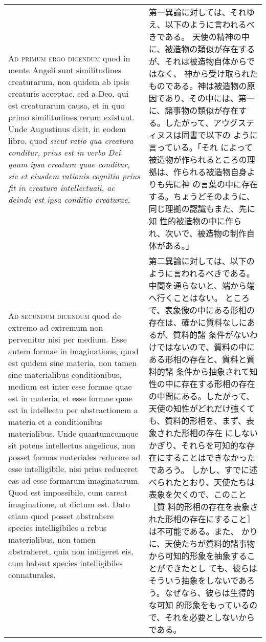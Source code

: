 \documentclass[10pt]{jsarticle} %
\begin{document}
\begin{longtable}{p{21em}p{21em}}
\\


{\scshape Ad primum ergo dicendum} quod in mente Angeli sunt
similitudines creaturarum, non quidem ab ipsis creaturis acceptae, sed a
Deo, qui est creaturarum causa, et in quo primo similitudines rerum
existunt. Unde Augustinus dicit, in eodem libro, quod {\itshape sicut ratio qua
creatura conditur, prius est in verbo Dei quam ipsa creatura quae
conditur, sic et eiusdem rationis cognitio prius fit in creatura
intellectuali, ac deinde est ipsa conditio creaturae}.

&

第一異論に対しては、それゆえ、以下のように言われるべきである。
天使の精神の中に、被造物の類似が存在するが、それは被造物自体からではなく、
 神から受け取られたものである。神は被造物の原因であり、その中には、第一
 に、諸事物の類似が存在する。したがって、アウグスティヌスは同書で以下の
 ように言っている。「それ
 によって被造物が作られるところの理拠は、作られる被造物自身よりも先に神
 の言葉の中に存在する。ちょうどそのように、同じ理拠の認識もまた、先に知
 性的被造物の中に作られ、次いで、被造物の制作自体がある。」

\\


{\scshape Ad secundum dicendum} quod de extremo ad extremum non
pervenitur nisi per medium. Esse autem formae in imaginatione, quod est
quidem sine materia, non tamen sine materialibus conditionibus, medium
est inter esse formae quae est in materia, et esse formae quae est in
intellectu per abstractionem a materia et a conditionibus
materialibus. Unde quantumcumque sit potens intellectus angelicus, non
posset formas materiales reducere ad esse intelligibile, nisi prius
reduceret eas ad esse formarum imaginatarum. Quod est impossibile, cum
careat imaginatione, ut dictum est. Dato etiam quod posset abstrahere
species intelligibiles a rebus materialibus, non tamen abstraheret, quia
non indigeret eis, cum habeat species intelligibiles connaturales.

&

第二異論に対しては、以下のように言われるべきである。
中間を通らないと、端から端へ行くことはない。
ところで、表象像の中にある形相の存在は、確かに質料なしにあるが、質料的諸
 条件がないわけではないので、質料の中にある形相の存在と、質料と質料的諸
 条件から抽象されて知性の中に存在する形相の存在の中間にある。したがって、
 天使の知性がどれだけ強くても、質料的形相を、まず、表象された形相の存在
 にしないかぎり、それらを可知的な存在にすることはできなかったであろう。
 しかし、すでに述べられたとおり、天使たちは表象を欠くので、このこと［質
 料的形相の存在を表象された形相の存在にすること］は不可能である。また、
 かりに、天使たちが質料的諸事物から可知的形象を抽象することができたとし
 ても、彼らはそういう抽象をしないであろう。なぜなら、彼らは生得的な可知
 的形象をもっているので、それを必要としないからである。



\end{longtable}
\end{document}
